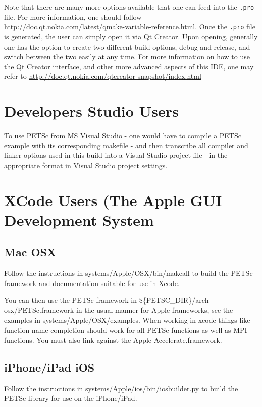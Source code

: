 {{Note that there are many more options available that one can feed into the \texttt{.pro} file. For more information, one should follow \url{http://doc.qt.nokia.com/latest/qmake-variable-reference.html}. Once the \texttt{.pro} file is generated, the user can simply open it via Qt Creator. Upon opening, generally one has the option to create two different build options, debug and release, and switch between the two easily at any time. For more information on how to use the Qt Creator interface, and other more advanced aspects of this IDE, one may refer to \url{http://doc.qt.nokia.com/qtcreator-snapshot/index.html}

\section{Developers Studio Users} 

To use PETSc from MS Visual Studio - one would have to compile a PETSc example with its corresponding makefile - and then transcribe all compiler and linker options used in this build into a Visual Studio project file - in the appropriate format in Visual Studio project settings.

\section{XCode Users (The Apple GUI Development System} 

\subsection{Mac OSX}

Follow the instructions in systems/Apple/OSX/bin/makeall to build the PETSc framework and documentation suitable for use in Xcode.

You can then use the PETSc framework in \$\{PETSC\_DIR\}/arch-osx/PETSc.framework in the usual manner for Apple frameworks, see the examples in systems/Apple/OSX/examples.  When working in xcode things like function name completion should work for all PETSc functions as well as MPI functions. You must also link against the Apple Accelerate.framework.

\subsection{iPhone/iPad iOS}

Follow the instructions in systems/Apple/ios/bin/iosbuilder.py to build the PETSc library for use on the iPhone/iPad.

}}
